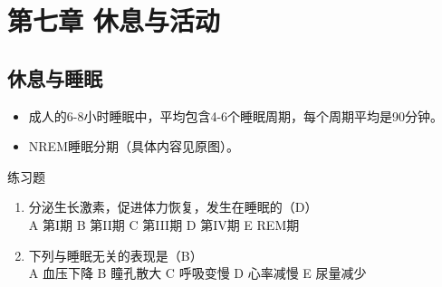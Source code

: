 \documentclass[11pt, a4paper]{ctexart}
\newcommand{\ocrimage}[1]{\texttt{#1}}
\begin{document}
\section{第七章 休息与活动}
\subsection{休息与睡眠}
\begin{itemize}
    \item 成人的6-8小时睡眠中，平均包含4-6个睡眠周期，每个周期平均是90分钟。
    \item NREM睡眠分期（具体内容见原图）。
\end{itemize}

\begin{examplebox}{练习题}
\begin{enumerate}
    \item 分泌生长激素，促进体力恢复，发生在睡眠的（D）\\
    A 第I期 \quad B 第II期 \quad C 第III期 \quad D 第IV期 \quad E REM期
    \item 下列与睡眠无关的表现是（B）\\
    A 血压下降 \quad B 瞳孔散大 \quad C 呼吸变慢 \quad D 心率减慢 \quad E 尿量减少
\end{enumerate}
\end{examplebox}
\end{document}
